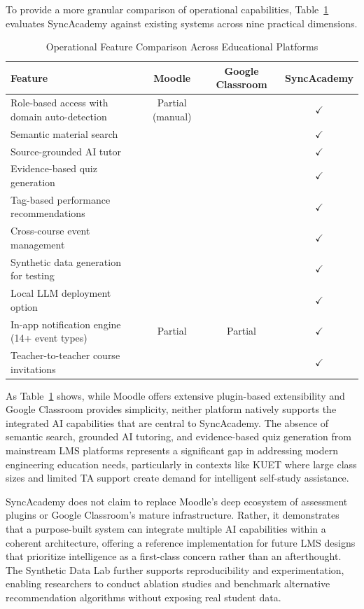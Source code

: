 \documentclass[12pt,a4paper]{report}
\begin{document}
To provide a more granular comparison of operational capabilities, Table~\ref{tab:operational} evaluates SyncAcademy against existing systems across nine practical dimensions.

\begin{table}[htbp]
\caption{Operational Feature Comparison Across Educational Platforms}
\label{tab:operational}
\centering
\small
\begin{tabularx}{\textwidth}{|X|c|c|c|}
\hline
\textbf{Feature} & \textbf{Moodle} & \textbf{Google Classroom} & \textbf{SyncAcademy} \\
\hline
Role-based access with domain auto-detection & Partial (manual) & & $\checkmark$ \\
\hline
Semantic material search & & & $\checkmark$ \\
\hline
Source-grounded AI tutor & & & $\checkmark$ \\
\hline
Evidence-based quiz generation & & & $\checkmark$ \\
\hline
Tag-based performance recommendations & & & $\checkmark$ \\
\hline
Cross-course event management & & & $\checkmark$ \\
\hline
Synthetic data generation for testing & & & $\checkmark$ \\
\hline
Local LLM deployment option & & & $\checkmark$ \\
\hline
In-app notification engine (14+ event types) & Partial & Partial & $\checkmark$ \\
\hline
Teacher-to-teacher course invitations & & & $\checkmark$ \\
\hline
\end{tabularx}
\end{table}

As Table~\ref{tab:operational} shows, while Moodle offers extensive plugin-based extensibility and Google Classroom provides simplicity, neither platform natively supports the integrated AI capabilities that are central to SyncAcademy. The absence of semantic search, grounded AI tutoring, and evidence-based quiz generation from mainstream LMS platforms represents a significant gap in addressing modern engineering education needs, particularly in contexts like KUET where large class sizes and limited TA support create demand for intelligent self-study assistance.

SyncAcademy does not claim to replace Moodle's deep ecosystem of assessment plugins or Google Classroom's mature infrastructure. Rather, it demonstrates that a purpose-built system can integrate multiple AI capabilities within a coherent architecture, offering a reference implementation for future LMS designs that prioritize intelligence as a first-class concern rather than an afterthought. The Synthetic Data Lab further supports reproducibility and experimentation, enabling researchers to conduct ablation studies and benchmark alternative recommendation algorithms without exposing real student data.
\end{document}
